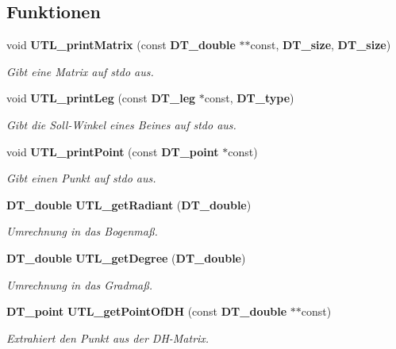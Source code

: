 \subsection*{Funktionen}
\begin{DoxyCompactItemize}
\item 
void {\bf UTL\_\-printMatrix} (const {\bf DT\_\-double} $\ast$$\ast$const, {\bf DT\_\-size}, {\bf DT\_\-size})
\begin{DoxyCompactList}\small\item\em Gibt eine Matrix auf stdo aus. \item\end{DoxyCompactList}\item 
void {\bf UTL\_\-printLeg} (const {\bf DT\_\-leg} $\ast$const, {\bf DT\_\-type})
\begin{DoxyCompactList}\small\item\em Gibt die Soll-\/Winkel eines Beines auf stdo aus. \item\end{DoxyCompactList}\item 
void {\bf UTL\_\-printPoint} (const {\bf DT\_\-point} $\ast$const)
\begin{DoxyCompactList}\small\item\em Gibt einen Punkt auf stdo aus. \item\end{DoxyCompactList}\item 
{\bf DT\_\-double} {\bf UTL\_\-getRadiant} ({\bf DT\_\-double})
\begin{DoxyCompactList}\small\item\em Umrechnung in das Bogenmaß. \item\end{DoxyCompactList}\item 
{\bf DT\_\-double} {\bf UTL\_\-getDegree} ({\bf DT\_\-double})
\begin{DoxyCompactList}\small\item\em Umrechnung in das Gradmaß. \item\end{DoxyCompactList}\item 
{\bf DT\_\-point} {\bf UTL\_\-getPointOfDH} (const {\bf DT\_\-double} $\ast$$\ast$const)
\begin{DoxyCompactList}\small\item\em Extrahiert den Punkt aus der DH-\/Matrix. \item\end{DoxyCompactList}\item 

\end{DoxyCompactItemize}
